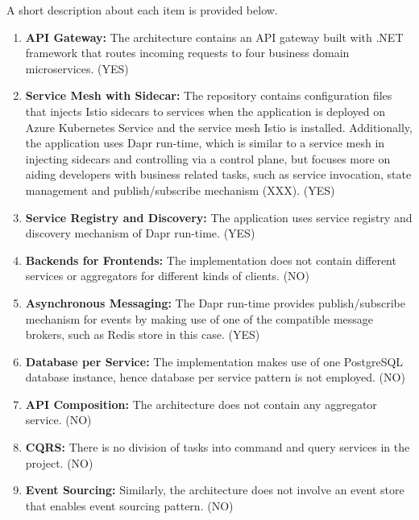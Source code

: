 \documentclass{Configuration_Files/PoliMi3i_thesis}
\begin{document}
A short description about each item is provided below.

\begin{enumerate}
    \item \textbf{API Gateway:} The architecture contains an API gateway built with .NET framework that routes incoming requests to four business domain microservices. (YES)
    
    \item \textbf{Service Mesh with Sidecar:} The repository contains configuration files that injects Istio sidecars to services when the application is deployed on Azure Kubernetes Service and the service mesh Istio is installed.
    Additionally, the application uses Dapr run-time, which is similar to a service mesh in injecting sidecars and controlling via a control plane, but focuses more on aiding developers with business related tasks, such as service invocation, state management and publish/subscribe mechanism (XXX). (YES)
    
    \item \textbf{Service Registry and Discovery:} The application uses service registry and discovery mechanism of Dapr run-time. (YES)
    
    \item \textbf{Backends for Frontends:} The implementation does not contain different services or aggregators for different kinds of clients. (NO)
    
    \item \textbf{Asynchronous Messaging:} The Dapr run-time provides publish/subscribe mechanism for events by making use of one of the compatible message brokers, such as Redis store in this case. (YES)
    
    \item \textbf{Database per Service:} The implementation makes use of one PostgreSQL database instance, hence database per service pattern is not employed. (NO)
    
    \item \textbf{API Composition:} The architecture does not contain any aggregator service. (NO)
    
    \item \textbf{CQRS:} There is no division of tasks into command and query services in the project. (NO)
    
    \item \textbf{Event Sourcing:} Similarly, the architecture does not involve an event store that enables event sourcing pattern. (NO)
    

\end{enumerate}
\end{document}

